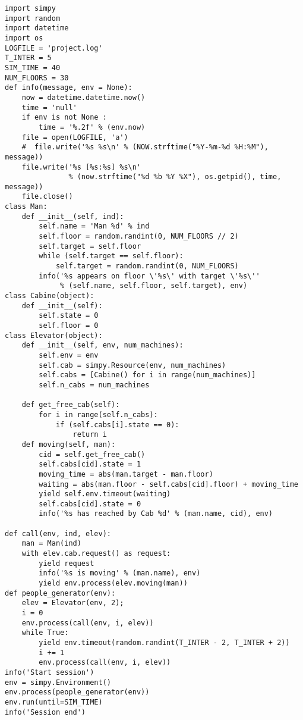 \begin{lstlisting}
import simpy
import random
import datetime
import os
LOGFILE = 'project.log'
T_INTER = 5
SIM_TIME = 40
NUM_FLOORS = 30
def info(message, env = None):
    now = datetime.datetime.now()
    time = 'null'
    if env is not None :
        time = '%.2f' % (env.now)
    file = open(LOGFILE, 'a')
    #  file.write('%s %s\n' % (NOW.strftime("%Y-%m-%d %H:%M"), message))
    file.write('%s [%s:%s] %s\n'
               % (now.strftime("%d %b %Y %X"), os.getpid(), time, message))
    file.close()
class Man:
    def __init__(self, ind):
        self.name = 'Man %d' % ind
        self.floor = random.randint(0, NUM_FLOORS // 2)
        self.target = self.floor
        while (self.target == self.floor):
            self.target = random.randint(0, NUM_FLOORS)
        info('%s appears on floor \'%s\' with target \'%s\''
             % (self.name, self.floor, self.target), env)
class Cabine(object):
    def __init__(self):
        self.state = 0
        self.floor = 0
class Elevator(object):
    def __init__(self, env, num_machines):
        self.env = env
        self.cab = simpy.Resource(env, num_machines)
        self.cabs = [Cabine() for i in range(num_machines)]
        self.n_cabs = num_machines

    def get_free_cab(self):
        for i in range(self.n_cabs):
            if (self.cabs[i].state == 0):
                return i
    def moving(self, man):
        cid = self.get_free_cab()
        self.cabs[cid].state = 1
        moving_time = abs(man.target - man.floor)
        waiting = abs(man.floor - self.cabs[cid].floor) + moving_time
        yield self.env.timeout(waiting)
        self.cabs[cid].state = 0
        info('%s has reached by Cab %d' % (man.name, cid), env)

def call(env, ind, elev):
    man = Man(ind)
    with elev.cab.request() as request:
        yield request
        info('%s is moving' % (man.name), env)
        yield env.process(elev.moving(man))
def people_generator(env):
    elev = Elevator(env, 2);
    i = 0
    env.process(call(env, i, elev))
    while True:
        yield env.timeout(random.randint(T_INTER - 2, T_INTER + 2))
        i += 1
        env.process(call(env, i, elev))
info('Start session')
env = simpy.Environment()
env.process(people_generator(env))
env.run(until=SIM_TIME)
info('Session end')
\end{lstlisting}
